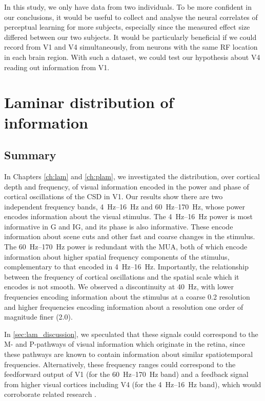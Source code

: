 In this study, we only have data from two individuals.
To be more confident in our conclusions, it would be useful to collect and analyse the neural correlates of perceptual learning for more subjects, especially since the measured effect size differed between our two subjects.
It would be particularly beneficial if we could record from \ac{V1} and \ac{V4} simultaneously, from neurons with the same \ac{RF} location in each brain region.
With such a dataset, we could test our hypothesis about \ac{V4} reading out information from \ac{V1}.


\section{Laminar distribution of information}

\subsection{Summary}

In Chapters \ref{ch:lam} and \ref{ch:plam}, we investigated the distribution, over cortical depth and frequency, of visual information encoded in the power and phase of cortical oscillations of the \ac{CSD} in \ac{V1}.
Our results show there are two independent frequency bands, \SIrange{4}{16}{Hz} and \SIrange{60}{170}{Hz}, whose power encodes information about the visual stimulus.
The \SIrange{4}{16}{Hz} power is most informative in \ac{G} and \ac{IG}, and its phase is also informative.
These encode information about scene cuts and other fast and coarse changes in the stimulus.
The \SIrange{60}{170}{Hz} power is redundant with the \ac{MUA}, both of which encode information about higher spatial frequency components of the stimulus, complementary to that encoded in \SIrange{4}{16}{Hz}.
Importantly, the relationship between the frequency of cortical oscillations and the spatial scale which it encodes is not smooth.
We observed a discontinuity at \SI{40}{Hz}, with lower frequencies encoding information about the stimulus at a coarse \SI{0.2}{\cpd} resolution and higher frequencies encoding information about a resolution one order of magnitude finer (\SI{2.0}{\cpd}).

In \autoref{sec:lam_discussion}, we speculated that these signals could correspond to the M- and P-pathways of visual information which originate in the retina, since these pathways are known to contain information about similar spatiotemporal frequencies.
Alternatively, these frequency ranges could correspond to the feedforward output of \ac{V1} (for the \SIrange{60}{170}{Hz} band) and a feedback signal from higher visual cortices including \ac{V4} (for the \SIrange{4}{16}{Hz} band), which would corroborate related research \citep{VanKerkoerle2014}.


